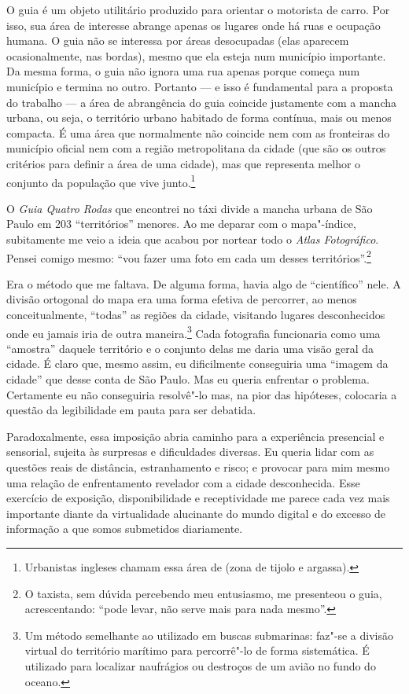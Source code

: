 O guia é um objeto utilitário produzido para orientar o motorista de
carro. Por isso, sua área de interesse abrange apenas os lugares onde há
ruas e ocupação humana. O guia não se interessa por áreas desocupadas
(elas aparecem ocasionalmente, nas bordas), mesmo que ela esteja num
município importante. Da mesma forma, o guia não ignora uma rua apenas
porque começa num município e termina no outro. Portanto --- e isso é
fundamental para a proposta do trabalho --- a área de abrangência do guia
coincide justamente com a mancha urbana, ou seja, o território urbano
habitado de forma contínua, mais ou menos compacta. É uma área que
normalmente não coincide nem com as fronteiras do município oficial nem
com a região metropolitana da cidade (que são os outros critérios para
definir a área de uma cidade), mas que representa melhor o conjunto da
população que vive junto.\footnote{Urbanistas ingleses chamam essa área
  de {} (zona de tijolo e argassa).}

O \emph{Guia Quatro Rodas} que encontrei no táxi divide a mancha urbana
de São Paulo em 203 ``territórios'' menores. Ao me
deparar com o mapa"-índice, subitamente me veio a ideia que acabou por
nortear todo o \emph{Atlas Fotográfico}. Pensei comigo mesmo: ``vou
fazer uma foto em cada um desses territórios''.\footnote{O taxista, sem
  dúvida percebendo meu entusiasmo, me presenteou o guia, acrescentando:
  ``pode levar, não serve mais para nada mesmo''.}

Era o método que me faltava. De alguma forma, havia algo de
``científico'' nele. A divisão ortogonal do mapa era uma forma efetiva
de percorrer, ao menos conceitualmente, ``todas'' as regiões da cidade,
visitando lugares desconhecidos onde eu jamais iria de outra
maneira.\footnote{Um método semelhante ao utilizado em buscas
  submarinas: faz"-se a divisão virtual do território marítimo para
  percorrê"-lo de forma sistemática. É utilizado para localizar
  naufrágios ou destroços de um avião no fundo do oceano.} Cada
fotografia funcionaria como uma ``amostra'' daquele território e o
conjunto delas me daria uma visão geral da cidade. É claro que, mesmo
assim, eu dificilmente conseguiria uma ``imagem da cidade'' que desse
conta de São Paulo. Mas eu queria enfrentar o problema. Certamente eu
não conseguiria resolvê"-lo mas, na pior das hipóteses, colocaria a
questão da legibilidade em pauta para ser debatida.

Paradoxalmente, essa imposição abria caminho para a experiência
presencial e sensorial, sujeita às surpresas e dificuldades diversas. Eu
queria lidar com as questões reais de distância, estranhamento e risco;
e provocar para mim mesmo uma relação de enfrentamento revelador com a
cidade desconhecida. Esse exercício de exposição, disponibilidade e
receptividade me parece cada vez mais importante diante da virtualidade
alucinante do mundo digital e do excesso de informação a que somos
submetidos diariamente.

